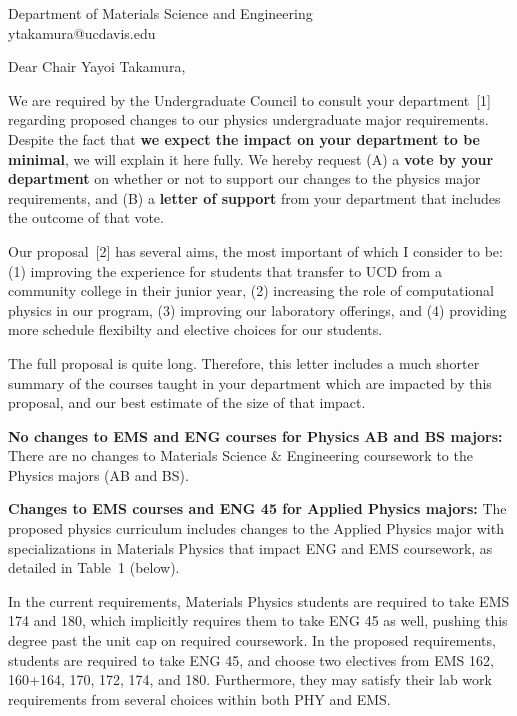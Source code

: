 \documentclass[letterpaper,12pt]{letter}
\def\letterparta{
We are required by the Undergraduate Council to consult your
department~[1] regarding proposed changes to our physics undergraduate
major requirements.  Despite the fact that {\bf we expect the
  impact on your department to be minimal}, we will explain it here
fully.  We hereby request (A) a {\bf vote by your department} on
whether or not to support our changes to the physics major
requirements, and (B) a {\bf letter of support} from your department
that includes the outcome of that vote.

Our proposal~[2] has several aims, the most important of which I
consider to be: (1) improving the experience for students that
transfer to UCD from a community college in their junior year, (2)
increasing the role of computational physics in our program, (3)
improving our laboratory offerings, and (4) providing more schedule
flexibilty and elective choices for our students.

The full proposal is quite long.  Therefore, this letter includes a
much shorter summary of the courses taught in your department which
are impacted by this proposal, and our best estimate of the size of
that impact.
}
\begin{document}
\begin{letter}{Department of Materials Science and Engineering \\ ytakamura@ucdavis.edu}

\opening{Dear Chair Yayoi Takamura,}

\letterparta

{\bf No changes to EMS and ENG courses for Physics AB and BS majors:}
There are no changes to Materials Science \& Engineering coursework
to the Physics majors (AB and BS).

{\bf Changes to EMS courses and ENG 45 for Applied Physics majors:}
The proposed physics curriculum includes changes to the Applied
Physics major with specializations in Materials Physics that impact
ENG and EMS coursework, as detailed in Table~1 (below).

In the current requirements, Materials Physics students are required
to take EMS 174 and 180, which implicitly requires them to take ENG 45
as well, pushing this degree past the unit cap on required coursework.
In the proposed requirements, students are required to take ENG 45,
and choose two electives from EMS 162, 160+164, 170, 172, 174, and
180.  Furthermore, they may satisfy their lab work requirements from
several choices within both PHY and EMS.


\end{letter}
\end{document}
